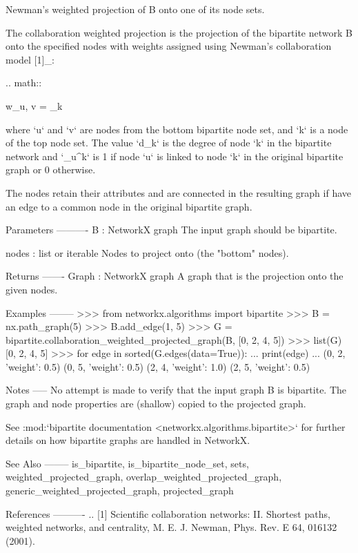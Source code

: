 \begin{DoxyVerb}Newman's weighted projection of B onto one of its node sets.

The collaboration weighted projection is the projection of the
bipartite network B onto the specified nodes with weights assigned
using Newman's collaboration model [1]_:

.. math::

    w_{u, v} = \sum_k 

where `u` and `v` are nodes from the bottom bipartite node set,
and `k` is a node of the top node set.
The value `d_k` is the degree of node `k` in the bipartite
network and `\delta_{u}^{k}` is 1 if node `u` is
linked to node `k` in the original bipartite graph or 0 otherwise.

The nodes retain their attributes and are connected in the resulting
graph if have an edge to a common node in the original bipartite
graph.

Parameters
----------
B : NetworkX graph
  The input graph should be bipartite.

nodes : list or iterable
  Nodes to project onto (the "bottom" nodes).

Returns
-------
Graph : NetworkX graph
   A graph that is the projection onto the given nodes.

Examples
--------
>>> from networkx.algorithms import bipartite
>>> B = nx.path_graph(5)
>>> B.add_edge(1, 5)
>>> G = bipartite.collaboration_weighted_projected_graph(B, [0, 2, 4, 5])
>>> list(G)
[0, 2, 4, 5]
>>> for edge in sorted(G.edges(data=True)):
...     print(edge)
...
(0, 2, {'weight': 0.5})
(0, 5, {'weight': 0.5})
(2, 4, {'weight': 1.0})
(2, 5, {'weight': 0.5})

Notes
-----
No attempt is made to verify that the input graph B is bipartite.
The graph and node properties are (shallow) copied to the projected graph.

See :mod:`bipartite documentation <networkx.algorithms.bipartite>`
for further details on how bipartite graphs are handled in NetworkX.

See Also
--------
is_bipartite,
is_bipartite_node_set,
sets,
weighted_projected_graph,
overlap_weighted_projected_graph,
generic_weighted_projected_graph,
projected_graph

References
----------
.. [1] Scientific collaboration networks: II.
    Shortest paths, weighted networks, and centrality,
    M. E. J. Newman, Phys. Rev. E 64, 016132 (2001).
\end{DoxyVerb}
 \mbox{\label{namespacenetworkx_1_1algorithms_1_1bipartite_1_1projection_acb316130921b3c729892efde7fe0f747}} 
